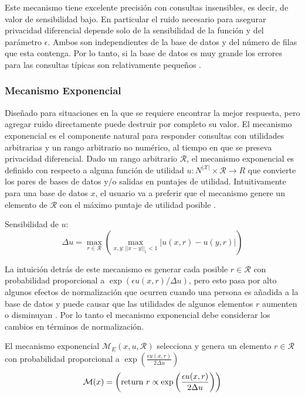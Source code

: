 Este mecanismo tiene excelente precisión con consultas insensibles, es decir, de valor de sensibilidad bajo. En particular el ruido necesario para asegurar privacidad diferencial depende solo de la sensibilidad de la función y del parámetro $\epsilon$. Ambos son independientes de la base de datos y del número de filas que esta contenga. Por lo tanto, si la base de datos es muy grande los errores para las consultas típicas son relativamente pequeños \cite{dwork2008differential}.

\subsubsection{Mecanismo Exponencial}

Diseñado para situaciones en la que se requiere encontrar la mejor respuesta, pero agregar ruido directamente puede destruir por completo  su valor. El mecanismo exponencial es el componente natural para responder consultas con utilidades arbitrarias y un rango arbitrario no numérico, al tiempo en que se preseva privacidad diferencial. Dado un rango arbitrario $\mathcal{R}$, el mecanismo exponencial es definido con respecto a alguna función de utilidad $u: N^{|\mathcal{X}|} \times \mathcal{R} \to R$ que convierte los pares de bases de datos y/o salidas en puntajes de utilidad. Intuitivamente para una base de datos $x$, el usuario va a preferir que el mecanismo genere un elemento de $\mathcal{R}$ con el máximo puntaje de utilidad posible \cite{dwork2014algorithmic}.

\begin{definicion}
  Sensibilidad de $u$:
  \begin{equation}
    \Delta u = \max_{r \in \mathcal{R}} \left( \max_{x,y:||x - y||_1 < 1} | u(x,r) - u(y,r)| \right)
  \end{equation}
\end{definicion}

La intuición detrás de este mecanismo es generar cada posible $r \in \mathcal{R}$ con probabilidad proporcional a $\exp(\epsilon u(x,r)/\Delta u)$, pero esto pasa por alto algunos efectos de normalización que ocurren cuando una persona es añadida a la base de datos y puede causar que las utilidades de algunos elementos $r$ aumenten o disminuyan \cite{dwork2014algorithmic}. Por lo tanto el mecanismo exponencial debe considerar los cambios en términos de normalización.

\begin{definicion}
  El mecanismo exponencial $\mathcal{M}_E (x,u,\mathcal{R})$ selecciona y genera un elemento $r \in \mathcal{R}$ con probabilidad proporcional a $\exp\left(\frac{\epsilon u(x,r)}{2\Delta u}\right)$
  \begin{equation}
    \mathcal{M}(x) = \left( \textup{return } r \propto \exp\left( \frac{\epsilon u(x,r)}{2\Delta u} \right) \right)
  \end{equation}
\end{definicion}

